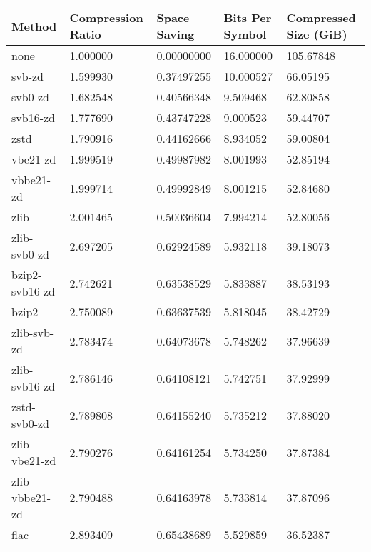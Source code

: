 	\begin{tabular}{|l|l|l|l|l|}
	    \hline
		Method & Compression Ratio & Space Saving & Bits Per Symbol & Compressed Size (GiB) \\
\hline
               none    &1.000000  & 0.00000000 &16.000000 &105.67848\\
             svb-zd    &1.599930  & 0.37497255 &10.000527 & 66.05195\\
         svb0-zd    &1.682548  & 0.40566348 & 9.509468 & 62.80858\\
           svb16-zd    &1.777690  & 0.43747228 & 9.000523 & 59.44707\\
               zstd    &1.790916  & 0.44162666 & 8.934052 & 59.00804\\
           vbe21-zd    &1.999519  & 0.49987982 & 8.001993 & 52.85194\\
          vbbe21-zd    &1.999714  & 0.49992849 & 8.001215 & 52.84680\\
               zlib    &2.001465  & 0.50036604 & 7.994214 & 52.80056\\
	       \hline
    zlib-svb0-zd    &2.697205  & 0.62924589 & 5.932118 & 39.18073\\
     bzip2-svb16-zd    &2.742621  & 0.63538529 & 5.833887 & 38.53193\\
              bzip2    &2.750089  & 0.63637539 & 5.818045 & 38.42729\\
        zlib-svb-zd    &2.783474  & 0.64073678 & 5.748262 & 37.96639\\
      zlib-svb16-zd    &2.786146  & 0.64108121 & 5.742751 & 37.92999\\
    zstd-svb0-zd    &2.789808  & 0.64155240 & 5.735212 & 37.88020\\
      zlib-vbe21-zd    &2.790276  & 0.64161254 & 5.734250 & 37.87384\\
     zlib-vbbe21-zd    &2.790488  & 0.64163978 & 5.733814 & 37.87096\\
           flac    &2.893409  & 0.65438689 & 5.529859 & 36.52387\\

\end{tabular}
